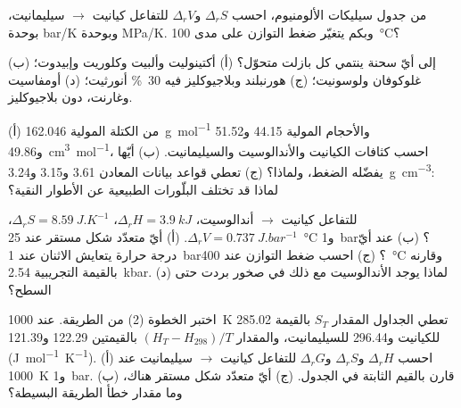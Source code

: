 \begin{exercise}[$\star$]\label{exo:b2:metamorphic-facies:2}
من جدول سيليكات الألومنيوم، احسب $\Delta_r S$ و$\Delta_r V$
 للتفاعل كيانيت $\to$ سيليمانيت، بوحدة \unit{bar/K} وبوحدة \unit{MPa/K}. وبكم
يتغيّر ضغط التوازن على مدى \qty{100}{\celsius}؟
\end{exercise}

\begin{exercise}[$\star$]\label{exo:b2:metamorphic-facies:3}
إلى أيّ سحنة ينتمي كل بازلت متحوّل؟ (أ) أكتينوليت وألبيت وكلوريت
وإبيدوت؛ (ب) غلوكوفان ولوسونيت؛ (ج) هورنبلند وبلاجيوكليز فيه
\qty{30}{\percent} أنورثيت؛ (د) أومفاسيت وغارنت، دون بلاجيوكليز.
\end{exercise}

\begin{exercise}[$\star$]\label{exo:b2:metamorphic-facies:4}
(أ) من الكتلة المولية \qty{162.046}{g.mol^{-1}} والأحجام المولية 44.15 و51.52
و\qty{49.86}{cm^3.mol^{-1}}، احسب كثافات الكيانيت والأندالوسيت والسيليمانيت.
(ب) أيّها يفضّله الضغط، ولماذا؟ (ج) تعطي قواعد بيانات المعادن 3.61 و3.15
و\qty{3.24}{g.cm^{-3}}: لماذا قد تختلف البلّورات الطبيعية عن الأطوار النقية؟
\end{exercise}

\begin{exercise}[$\star\star$]\label{exo:b2:metamorphic-facies:5}
للتفاعل كيانيت $\to$ أندالوسيت، $\Delta_r H = \qty{3.9}{kJ}$، $\Delta_r S =
\qty{8.59}{J.K^{-1}}$، $\Delta_r V = \qty{0.737}{J.bar^{-1}}$. (أ) أيّ متعدّد شكل
مستقر عند \qty{25}{\celsius} و\qty{1}{bar}؟ (ب) عند أيّ درجة حرارة يتعايش
الاثنان عند \qty{1}{bar}؟ (ج) احسب ضغط التوازن عند \qty{400}{\celsius}
وقارنه بالقيمة التجريبية \qty{2.54}{kbar}. (د) لماذا يوجد الأندالوسيت مع ذلك
في صخور بردت حتى السطح؟
\end{exercise}

\begin{exercise}[$\star\star$]\label{exo:b2:metamorphic-facies:6}
اختبر الخطوة (2) من الطريقة. عند \qty{1000}{K} تعطي الجداول المقدار $S_T$ بالقيمة 285.02 للكيانيت
و296.44 للسيليمانيت، والمقدار $(H_T - H_{298})/T$ بالقيمتين 122.29 و121.39
(\unit{J.mol^{-1}.K^{-1}}). (أ) احسب $\Delta_r H$ و$\Delta_r S$ و$\Delta_r G$ للتفاعل
كيانيت $\to$ سيليمانيت عند \qty{1000}{K} و\qty{1}{bar}. (ب) قارن بالقيم
الثابتة في الجدول. (ج) أيّ متعدّد شكل مستقر هناك، وما مقدار خطأ
الطريقة البسيطة؟
\end{exercise}

